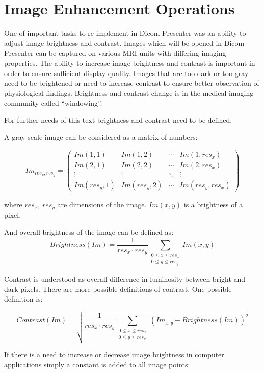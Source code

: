 \section{Image Enhancement Operations}
\label{brightnesscontrast}

One of important tasks to re-implement in Dicom-Presenter was an ability to adjust image brightness and contrast. Images which will be opened in Dicom-Presenter can be captured on various MRI units with differing imaging properties. The ability to increase image brightness and contrast is important in order to ensure sufficient display quality. Images that are too dark or too gray need to be brightened or need to increase contrast to ensure better observation of physiological findings. Brightness and contrast change is in the medical imaging community called ``windowing''.

For further needs of this text brightness and contrast need to be defined. 

A gray-scale image can be considered as a matrix of numbers\cite[p.~1]{imageprocessing}: 

\[
 Im_{res_{x},res_{y}} =
 \begin{pmatrix}
  Im(1,1) & Im(1,2) & \cdots & Im(1,res_{x}) \\
  Im(2,1) & Im(2,2) & \cdots & Im(2,res_{x}) \\
  \vdots  & \vdots  & \ddots & \vdots  \\
  Im(res_{y},1) & Im(res_{y},2) & \cdots & Im(res_{y},res_{x})
 \end{pmatrix}
\]

where $ res_{x} $, $res_{y}$ are dimensions of the image. $Im(x,y)$ is a brightness of a pixel.

And overall brightness of the image can be defined as:
\[
  Brightness(Im) = \frac{1}{res_{x}  \cdot res_{y}}\sum_{\substack{0 \leq x \leq res_{x} \\ 0 \leq y \leq res_{y}}} Im(x,y)
\]

Contrast is understood as overall difference in luminosity between bright and dark pixels. There are more possible definitions of contrast. One possible definition is\cite{contrastinimages}:

\[
Contrast(Im) = \sqrt{\frac{1}{res_{x} \cdot res_{y}}\sum_{\substack{ 0 \leq x \leq res_{x} \\ 0 \leq y \leq res_{y} }}(Im_{x,y}-Brightness(Im))^2}
\]

If there is a need to increase or decrease image brightness in computer applications simply a constant is added to all image points:

